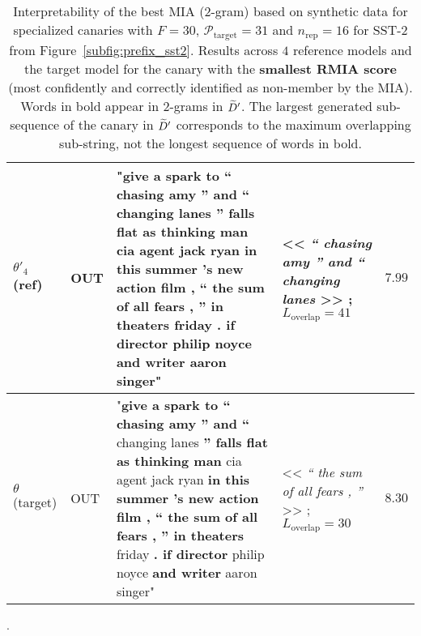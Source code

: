 \begin{table*}[ht]
\begin{tabular}{C{1.4cm}C{0.8cm}p{8cm}C{2.5cm}C{1.1cm}}
        \midrule
        $\theta'_4$ (ref) & OUT & "\textbf{give a spark to `` chasing amy '' and `` changing lanes '' falls flat as thinking man} cia agent jack ryan \textbf{in this summer 's new action film , `` the sum of all fears , '' in theaters} friday . \textbf{if director philip noyce and writer} aaron singer" & <<\textit{ `` chasing amy '' and `` changing lanes }>> ; $L_{\text{overlap}}=41$ & $7.99$ \\
        \midrule
        $\theta$ (target) & OUT & "\textbf{give a spark to `` chasing amy '' and ``} changing lanes \textbf{'' falls flat as thinking man} cia agent jack ryan \textbf{in this summer 's new action film , `` the sum of all fears , '' in theaters} friday \textbf{. if director} philip noyce \textbf{and writer} aaron singer" & <<\textit{ `` the sum of all fears , '' }>> ; $L_{\text{overlap}}=30$ & $8.30$ \\
        \bottomrule
    \end{tabular}
    \caption{Interpretability of the best MIA ($2$-gram) based on synthetic data for specialized canaries with $F=30$, $\mathcal{P}_\textrm{target}=31$ and $n_\textrm{rep}=16$ for SST-2 from Figure~\ref{subfig:prefix_sst2}. Results across $4$ reference models and the target model for the canary with the \textbf{smallest RMIA score} (most confidently and correctly identified as non-member by the MIA). Words in bold appear in 2-grams in ${\widetilde{D}}'$. The largest generated sub-sequence of the canary in ${\widetilde{D}}'$ corresponds to the maximum overlapping sub-string, not the longest sequence of words in bold.}. 
    \label{tab:interpretability_smallest}
\end{table*}
